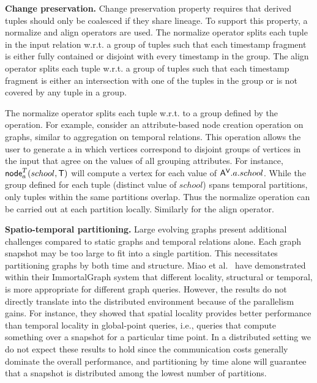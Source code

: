 {\bf Change preservation.}  Change preservation property requires that
derived tuples should only be coalesced if they share lineage.  To
support this property, a normalize and align operators are used.  The
normalize operator splits each tuple in the input relation w.r.t. a
group of tuples such that each timestamp fragment is either fully
contained or disjoint with every timestamp in the group.  The align
operator splits each tuple w.r.t. a group of tuples such that each
timestamp fragment is either an intersection with one of the tuples in
the group or is not covered by any tuple in a group.

The normalize operator splits each tuple w.r.t. to a group defined by
the operation.  For example, consider an attribute-based node creation
operation on graphs, similar to aggregation on temporal relations.
This operation allows the user to generate a \tg in which vertices
correspond to disjoint groups of vertices in the input that agree on
the values of all grouping attributes.  For instance,
$\textsf{node}^T_a(school,\mathsf{T})$ will compute a vertex for each value
of $\mathsf{A^{V}}.a.school$.  While the group defined for each tuple (distinct
value of $school$) spans temporal partitions, only tuples within the
same partitions overlap.  Thus the normalize operation can be carried
out at each partition locally.  Similarly for the align operator.

{\bf Spatio-temporal partitioning.}  Large evolving graphs present
additional challenges compared to static graphs and temporal relations
alone.  Each graph snapshot may be too large to fit into a single
partition.  This necessitates partitioning graphs by both time and
structure.  Miao et al.~\cite{Miao2015} have demonstrated within their
ImmortalGraph system that different locality, structural or temporal,
is more appropriate for different graph queries.  However, the results
do not directly translate into the distributed environment because of
the parallelism gains.  For instance, they showed that spatial
locality provides better performance than temporal locality in
global-point queries, i.e., queries that compute something over a
snapshot for a particular time point.  In a distributed setting we do
not expect these results to hold since the communication costs
generally dominate the overall performance, and partitioning by time
alone will guarantee that a snapshot is distributed among the lowest
number of partitions.

